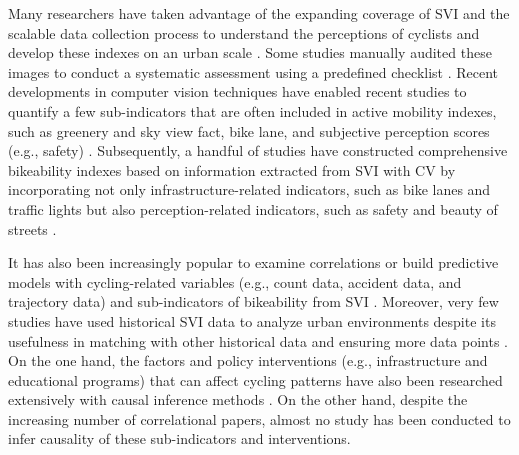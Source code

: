 \documentclass[preprint,12pt, authoryear]{elsarticle}
\begin{document}
Many researchers have taken advantage of the expanding coverage of SVI and the scalable data collection process to understand the perceptions of cyclists and develop these indexes on an urban scale \citep{ito_understanding_2024, yin_measuring_2016, li_investigating_2018}. Some studies manually audited these images to conduct a systematic assessment using a predefined checklist \citep{yin_street_2017, gu_using_2018, yoo_are_2024}. Recent developments in computer vision techniques have enabled recent studies to quantify a few sub-indicators that are often included in active mobility indexes, such as greenery and sky view fact, bike lane, and subjective perception scores (e.g., safety) \citep{wang_relationship_2019, wu_does_2020, basu_how_2022, zeng_measuring_2024}. Subsequently, a handful of studies have constructed comprehensive bikeability indexes based on information extracted from SVI with CV by incorporating not only infrastructure-related indicators, such as bike lanes and traffic lights but also perception-related indicators, such as safety and beauty of streets \citep{wang_linkage_2019, ito_assessing_2021a, koo_development_2022}. 

It has also been increasingly popular to examine correlations or build predictive models with cycling-related variables (e.g., count data, accident data, and trajectory data) and sub-indicators of bikeability from SVI \citep{yang_global_2020, nagata_objective_2020, wang_relationship_2020, hankey_predicting_2021, zhou_assessing_2023, ye_unpacking_2024, rui_built_2024, xue_integrating_2024, zhao_preferred_2024, gong_deciphering_2024, wang_evaluating_2024, vega_assessing_2024}.
Moreover, very few studies have used historical SVI data to analyze urban environments despite its usefulness in matching with other historical data and ensuring more data points \citep{liang_revealing_2023, stalder_selfsupervised_2024}.
On the one hand, the factors and policy interventions (e.g., infrastructure and educational programs) that can affect cycling patterns have also been researched extensively with causal inference methods \citep{burbidge_evaluating_2009, aittasalo_socioecological_2019, hong_can_2020, li_effects_2019, kearns_increasing_2019, vidaltortosa_cycling_2021, piras_could_2021}.
On the other hand, despite the increasing number of correlational papers, almost no study has been conducted to infer causality of these sub-indicators and interventions.
\end{document}
